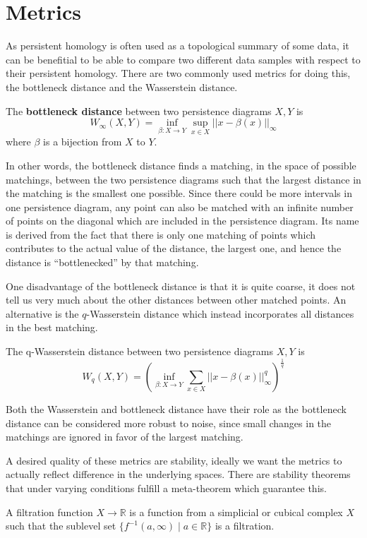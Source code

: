   \section{Metrics}
  As persistent homology is often used as a topological summary of some data, it can be benefitial to be able to compare two different data samples with respect to their persistent homology. There are two commonly used metrics for doing this, the bottleneck distance and the Wasserstein distance.
  \begin{definition}
    The \textbf{bottleneck distance} between two persistence diagrams $X,Y$ is
    \[W_{\infty}(X,Y) = \inf_{\beta: X \to Y} \sup_{x \in X} ||x-\beta(x)||_{\infty}\]
    where $\beta$ is a bijection from $X$ to $Y$.
  \end{definition}
In other words, the bottleneck distance finds a matching, in the space of possible matchings, between the two persistence diagrams such that the largest distance in the matching is the smallest one possible. Since there could be more intervals in one persistence diagram, any point can also be matched with an infinite number of points on the diagonal which are included in the persistence diagram. Its name is derived from the fact that there is only one matching of points which contributes to the actual value of the distance, the largest one, and hence the distance is ``bottlenecked'' by that matching.

One disadvantage of the bottleneck distance is that it is quite coarse, it does not tell us very much about the other distances between other matched points. An alternative is the $q$-Wasserstein distance which instead incorporates all distances in the best matching.
  \begin{definition}
    The q-Wasserstein distance between two persistence diagrams $X,Y$ is
    \[W_{q}(X,Y) = (\inf_{\beta: X \to Y} \sum_{x \in X}  ||x-\beta(x)||_{\infty}^{q})^{\frac{1}{q}}\]
  \end{definition}
  Both the Wasserstein and bottleneck distance have their role as the bottleneck distance can be considered more robust to noise, since small changes in the matchings are ignored in favor of the largest matching.

  A desired quality of these metrics are stability, ideally we want the metrics to actually reflect difference in the underlying spaces. There are stability theorems that under varying conditions fulfill a meta-theorem which guarantee this.

  \begin{definition}
    A filtration function $X \to \mathbb{R}$ is a function from a simplicial or cubical complex $X$ such that the sublevel set $\{ f^{-1}(a,\infty) \mid a \in \mathbb{R} \}$ is a filtration.
  \end{definition}

